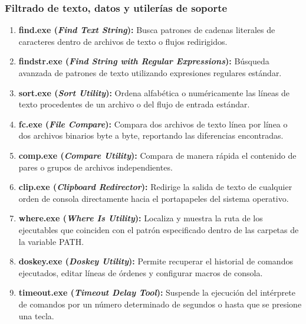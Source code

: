 \documentclass[12pt]{article}
\begin{document}
\subsubsection{Filtrado de texto, datos y utilerías de soporte}
\begin{enumerate}[leftmargin=*, noitemsep, topsep=1pt]
    \item \textbf{find.exe (\textit{Find Text String}):} Busca patrones de cadenas literales de caracteres dentro de archivos de texto o flujos redirigidos.
    \item \textbf{findstr.exe (\textit{Find String with Regular Expressions}):} Búsqueda avanzada de patrones de texto utilizando expresiones regulares estándar.
    \item \textbf{sort.exe (\textit{Sort Utility}):} Ordena alfabética o numéricamente las líneas de texto procedentes de un archivo o del flujo de entrada estándar.
    \item \textbf{fc.exe (\textit{File Compare}):} Compara dos archivos de texto línea por línea o dos archivos binarios byte a byte, reportando las diferencias encontradas.
    \item \textbf{comp.exe (\textit{Compare Utility}):} Compara de manera rápida el contenido de pares o grupos de archivos independientes.
    \item \textbf{clip.exe (\textit{Clipboard Redirector}):} Redirige la salida de texto de cualquier orden de consola directamente hacia el portapapeles del sistema operativo.
    \item \textbf{where.exe (\textit{Where Is Utility}):} Localiza y muestra la ruta de los ejecutables que coinciden con el patrón especificado dentro de las carpetas de la variable PATH.
    \item \textbf{doskey.exe (\textit{Doskey Utility}):} Permite recuperar el historial de comandos ejecutados, editar líneas de órdenes y configurar macros de consola.
    \item \textbf{timeout.exe (\textit{Timeout Delay Tool}):} Suspende la ejecución del intérprete de comandos por un número determinado de segundos o hasta que se presione una tecla.
\end{enumerate}
\end{document}
